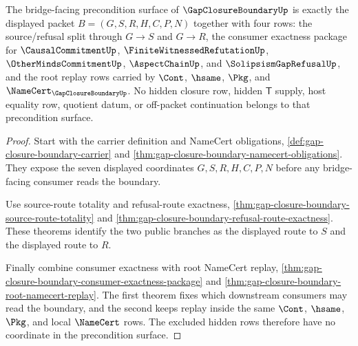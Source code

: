 \begin{theorem}
\label{thm:gap-closure-boundary-bridge-precondition-surface}
The bridge-facing precondition surface of $\GapClosureBoundaryUp$ is exactly the displayed packet $B=(G,S,R,H,C,P,N)$ together with four rows: the source/refusal split through $G \longrightarrow S$ and $G \longrightarrow R$, the consumer exactness package for $\CausalCommitmentUp$, $\FiniteWitnessedRefutationUp$, $\OtherMindsCommitmentUp$, $\AspectChainUp$, and $\SolipsismGapRefusalUp$, and the root replay rows carried by $\Cont$, $\hsame$, $\Pkg$, and $\NameCert_{\GapClosureBoundaryUp}$. No hidden closure row, hidden $\mathsf{T}$ supply, host equality row, quotient datum, or off-packet continuation belongs to that precondition surface.
\end{theorem}
\begin{proof}
Start with the carrier definition and NameCert obligations, \autoref{def:gap-closure-boundary-carrier} and \autoref{thm:gap-closure-boundary-namecert-obligations}. They expose the seven displayed coordinates $G,S,R,H,C,P,N$ before any bridge-facing consumer reads the boundary.

Use source-route totality and refusal-route exactness, \autoref{thm:gap-closure-boundary-source-route-totality} and \autoref{thm:gap-closure-boundary-refusal-route-exactness}. These theorems identify the two public branches as the displayed route to $S$ and the displayed route to $R$.

Finally combine consumer exactness with root NameCert replay, \autoref{thm:gap-closure-boundary-consumer-exactness-package} and \autoref{thm:gap-closure-boundary-root-namecert-replay}. The first theorem fixes which downstream consumers may read the boundary, and the second keeps replay inside the same $\Cont$, $\hsame$, $\Pkg$, and local $\NameCert$ rows. The excluded hidden rows therefore have no coordinate in the precondition surface.
\end{proof}

